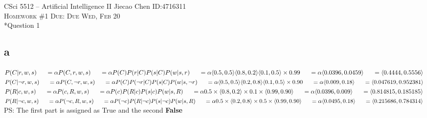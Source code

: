 \message{ !name(solution_hw2.tex)}\documentclass[12pt]{amsart}
\makeatletter
\renewcommand{\section}{\@startsection{section}{1}{0mm}
{-\baselineskip}{0.5\baselineskip}{\bf\leftline}}
\makeatother
\begin{document}

\noindent CSci 5512 -- Artificial Intelligence II \hfill Jiecao Chen \hfill ID:4716311 \\
\textsc{Homework \#1 \hfill Due: Due Wed, Feb 20}\\

\section*{Question 1} 
\subsection*{a}
$P(C|r,w,s)\\
\indent =\alpha P(C,r,w,s)\\ 
\indent =\alpha P(C)P(r|C)P(s|C)P(w|s,r)\\
\indent =\alpha \langle 0.5,0.5\rangle\langle 0.8,0.2\rangle\langle 0.1,0.5\rangle\times 0.99\\
\indent =\alpha \langle 0.0396,0.0459\rangle\\
\indent =\langle 0.4444,0.5556\rangle$\\

$P(C|\neg r,w,s)\\
\indent =\alpha P(C,\neg r,w,s)\\ 
\indent =\alpha P(C)P(\neg r|C)P(s|C)P(w|s,\neg r)\\
\indent =\alpha \langle 0.5,0.5\rangle\langle 0.2,0.8\rangle\langle 0.1,0.5\rangle\times 0.90\\
\indent =\alpha \langle 0.009,0.18\rangle\\
\indent =\langle 0.047619,0.952381\rangle$\\


$P(R|c,w,s)\\
\indent =\alpha P(c,R,w,s)\\ 
\indent =\alpha P(c)P(R|c)P(s|c)P(w|s,R)\\
\indent =\alpha 0.5\times \langle 0.8,0.2\rangle\times 0.1 \times \langle 0.99,0.90\rangle\\
\indent =\alpha \langle 0.0396, 0.009\rangle\\
\indent =\langle 0.814815, 0.185185\rangle$\\

$P(R|\neg c,w,s)\\
\indent =\alpha P(\neg c,R,w,s)\\ 
\indent =\alpha P(\neg c)P(R|\neg c)P(s|\neg c)P(w|s,R)\\
\indent =\alpha 0.5\times \langle 0.2,0.8\rangle\times 0.5 \times \langle 0.99,0.90\rangle\\
\indent =\alpha \langle 0.0495, 0.18\rangle\\
\indent =\langle 0.215686, 0.784314\rangle$\\
PS: The first part is assigned as True and the second \textbf{False}
\end{document}
